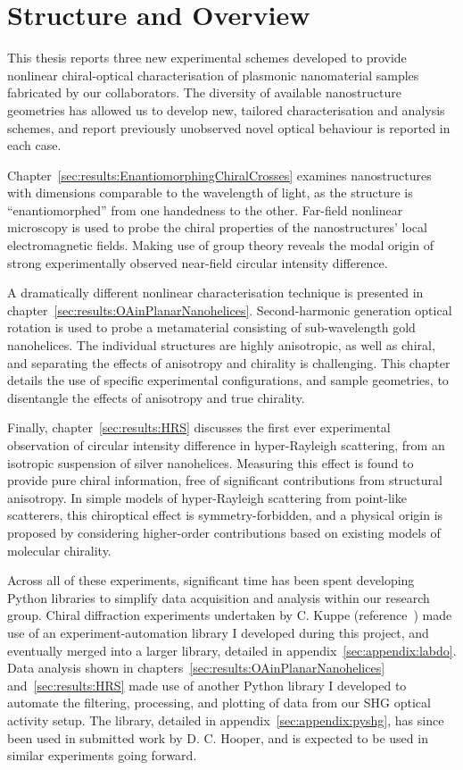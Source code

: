 \chapter{Structure and Overview}\label{sec:background:Introduction}

This thesis reports three new experimental schemes developed to provide nonlinear chiral-optical characterisation of plasmonic nanomaterial samples fabricated by our collaborators. 
The diversity of available nanostructure geometries has allowed us to develop new, tailored characterisation and analysis schemes, and report previously unobserved novel optical behaviour is reported in each case.

Chapter~\ref{sec:results:EnantiomorphingChiralCrosses} examines nanostructures with dimensions comparable to the wavelength of light, as the structure is ``enantiomorphed'' from one handedness to the other. Far-field nonlinear microscopy is used to probe the chiral properties of the nanostructures' local electromagnetic fields. Making use of group theory reveals the modal origin of strong experimentally observed near-field circular intensity difference. 

A dramatically different nonlinear characterisation technique is presented in chapter~\ref{sec:results:OAinPlanarNanohelices}. Second-harmonic generation optical rotation is used to probe a metamaterial consisting of sub-wavelength gold nanohelices. The individual structures are highly anisotropic, as well as chiral, and separating the effects of anisotropy and chirality is challenging. This chapter details the use of specific experimental configurations, and sample geometries, to disentangle the effects of anisotropy and true chirality. 

Finally, chapter~\ref{sec:results:HRS} discusses the first ever experimental observation of circular intensity difference in hyper-Rayleigh scattering, from an isotropic suspension of silver nanohelices. Measuring this effect is found to provide pure chiral information, free of significant contributions from structural anisotropy. In simple models of hyper-Rayleigh scattering from point-like scatterers, this chiroptical effect is symmetry-forbidden, and a physical origin is proposed by considering higher-order contributions based on existing models of molecular chirality.

Across all of these experiments, significant time has been spent developing Python libraries to simplify data acquisition and analysis within our research group. Chiral diffraction experiments undertaken by C. Kuppe (reference~\cite{Kuppe2018}) made use of an experiment-automation library I developed during this project, and eventually merged into a larger library, detailed in appendix~\ref{sec:appendix:labdo}. Data analysis shown in chapters~\ref{sec:results:OAinPlanarNanohelices} and~\ref{sec:results:HRS} made use of another Python library I developed to automate the filtering, processing, and plotting of data from our SHG optical activity setup. The library, detailed in appendix~\ref{sec:appendix:pyshg}, has since been used in submitted work by D. C. Hooper, and is expected to be used in similar experiments going forward.

